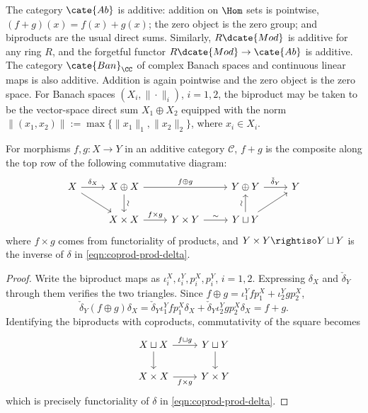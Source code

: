 \begin{example}\label{eg:additive-category}
	The category $\cate{Ab}$ is additive: addition on $\Hom$ sets is pointwise, $(f+g)(x)=f(x)+g(x)$; the zero object is the zero group; and biproducts are the usual direct sums. Similarly, $R\dcate{Mod}$ is additive for any ring $R$, and the forgetful functor $R\dcate{Mod}\to\cate{Ab}$ is additive. The category $\cate{Ban}_{\CC}$ of complex Banach spaces and continuous linear maps is also additive. Addition is again pointwise and the zero object is the zero space. For Banach spaces $(X_i,\|\cdot\|_i)$, $i=1,2$, the biproduct may be taken to be the vector-space direct sum $X_1\oplus X_2$ equipped with the norm $\|(x_1,x_2)\|:=\max\{\|x_1\|_1,\|x_2\|_2\}$, where $x_i\in X_i$.
\end{example}

\begin{proposition}\label{prop:additive-cat-addition}
	For morphisms $f,g:X\to Y$ in an additive category $\mathcal C$, $f+g$ is the composite along the top row of the following commutative diagram:
	\[\begin{tikzcd}
		X \arrow[r, "\delta_X"] \arrow[rd] & X \oplus X \arrow[rr, "f \oplus g"] \arrow[d, "\sim" sloped] & & Y \oplus Y \arrow[r, "\check{\delta}_Y"] & Y \\
		& X \times X \arrow[r, "f \times g"] & Y \times Y \arrow[r, "\sim"] & Y \sqcup Y \arrow[ru] \arrow[u, "\sim" sloped] &
	\end{tikzcd}\]
	where $f\times g$ comes from functoriality of products, and $Y\times Y\rightiso Y\sqcup Y$ is the inverse of $\delta$ in \eqref{eqn:coprod-prod-delta}.
\end{proposition}

\begin{proof}
	Write the biproduct maps as $\iota_i^X,\iota_i^Y,p_i^X,p_i^Y$, $i=1,2$. Expressing $\delta_X$ and $\check\delta_Y$ through them verifies the two triangles. Since $f\oplus g=\iota_1^Yfp_1^X+\iota_2^Ygp_2^X$,
	\begin{equation}
		\check{\delta}_Y (f \oplus g) \delta_X = \check{\delta}_Y \iota_1^Y f p^X_1 \delta_X + \check{\delta}_Y \iota_2^Y g p^X_2 \delta_X
		= f + g.
	\end{equation}
	Identifying the biproducts with coproducts, commutativity of the square becomes
	\[\begin{tikzcd}
		X \sqcup X \arrow[r, "{f \sqcup g}"] \arrow[d] & Y \sqcup Y \arrow[d] \\
		X \times X \arrow[r, "{f \times g}"'] & Y \times Y
	\end{tikzcd}\]
	which is precisely functoriality of $\delta$ in \eqref{eqn:coprod-prod-delta}.
\end{proof}

